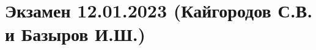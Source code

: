 \documentclass[main.tex]{subfiles}
\begin{document}

\section{Экзамен 12.01.2023 (Кайгородов С.В. и Базыров И.Ш.)}


\newpage


\newpage


\newpage


\newpage


\newpage


\newpage


\newpage


\newpage


\newpage


\newpage


\newpage


\newpage


\newpage


\newpage


\newpage


\newpage


\newpage


\newpage


\newpage


\newpage


\newpage


\newpage


\newpage


\newpage


\newpage


\newpage


\newpage


\newpage


\newpage
\end{document}

